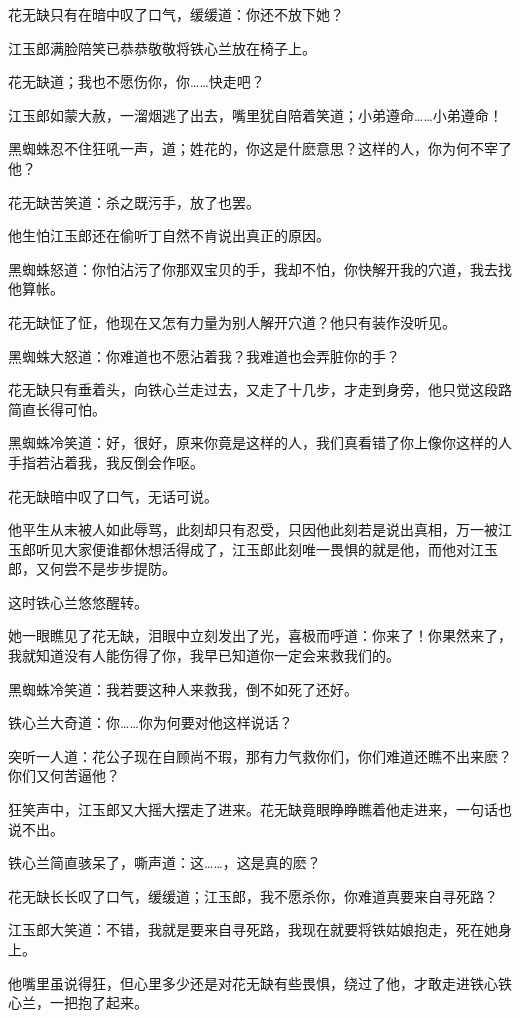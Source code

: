 \documentclass[12pt,oneside]{book}
\begin{document}
花无缺只有在暗中叹了口气，缓缓道：你还不放下她？

江玉郎满脸陪笑已恭恭敬敬将铁心兰放在椅子上。

花无缺道；我也不愿伤你，你\ldots\ldots 快走吧？

江玉郎如蒙大赦，一溜烟逃了出去，嘴里犹自陪着笑道；小弟遵命\ldots\ldots 小弟遵命！

黑蜘蛛忍不住狂吼一声，道；姓花的，你这是什麽意思？这样的人，你为何不宰了他？

花无缺苦笑道：杀之既污手，放了也罢。

他生怕江玉郎还在偷听丁自然不肯说出真正的原因。

黑蜘蛛怒道：你怕沾污了你那双宝贝的手，我却不怕，你快解开我的穴道，我去找他算帐。

花无缺怔了怔，他现在又怎有力量为别人解开穴道？他只有装作没听见。

黑蜘蛛大怒道：你难道也不愿沾着我？我难道也会弄脏你的手？

花无缺只有垂着头，向铁心兰走过去，又走了十几步，才走到身旁，他只觉这段路简直长得可怕。

黑蜘蛛冷笑道：好，很好，原来你竟是这样的人，我们真看错了你上像你这样的人手指若沾着我，我反倒会作呕。

花无缺暗中叹了口气，无话可说。

他平生从末被人如此辱骂，此刻却只有忍受，只因他此刻若是说出真相，万一被江玉郎听见大家便谁都休想活得成了，江玉郎此刻唯一畏惧的就是他，而他对江玉郎，又何尝不是步步提防。

这时铁心兰悠悠醒转。

她一眼瞧见了花无缺，泪眼中立刻发出了光，喜极而呼道：你来了！你果然来了，我就知道没有人能伤得了你，我早已知道你一定会来救我们的。

黑蜘蛛冷笑道：我若要这种人来救我，倒不如死了还好。

铁心兰大奇道：你\ldots\ldots 你为何要对他这样说话？

突听一人道：花公子现在自顾尚不瑕，那有力气救你们，你们难道还瞧不出来麽？你们又何苦逼他？

狂笑声中，江玉郎又大摇大摆走了进来。花无缺竟眼睁睁瞧着他走进来，一句话也说不出。

铁心兰简直骇呆了，嘶声道：这\ldots\ldots，这是真的麽？

花无缺长长叹了口气，缓缓道；江玉郎，我不愿杀你，你难道真要来自寻死路？

江玉郎大笑道：不错，我就是要来自寻死路，我现在就要将铁姑娘抱走，死在她身上。

他嘴里虽说得狂，但心里多少还是对花无缺有些畏惧，绕过了他，才敢走进铁心铁心兰，一把抱了起来。
\end{document}
